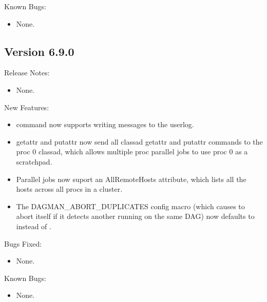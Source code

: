 \noindent Known Bugs:

\begin{itemize}

\item None.

\end{itemize}

\subsection*{\label{sec:New-6-9-0}Version 6.9.0}

\noindent Release Notes:

\begin{itemize}

\item None.

\end{itemize}


\noindent New Features:

\begin{itemize}

\item {} command now supports writing messages to the userlog.

\item {} getattr and putattr now send all classad getattr and putattr
commands to the proc 0 classad, which allows multiple proc parallel jobs to
use proc 0 as a scratchpad.

\item Parallel jobs now suport an AllRemoteHosts attribute, which lists all the
hosts across all procs in a cluster.

\item The DAGMAN\_ABORT\_DUPLICATES config macro (which causes
 to abort itself if it detects another 
running on the same DAG) now defaults to  instead of
.

\end{itemize}

\noindent Bugs Fixed:

\begin{itemize}

\item None.

\end{itemize}

\noindent Known Bugs:

\begin{itemize}

\item None.

\end{itemize}

